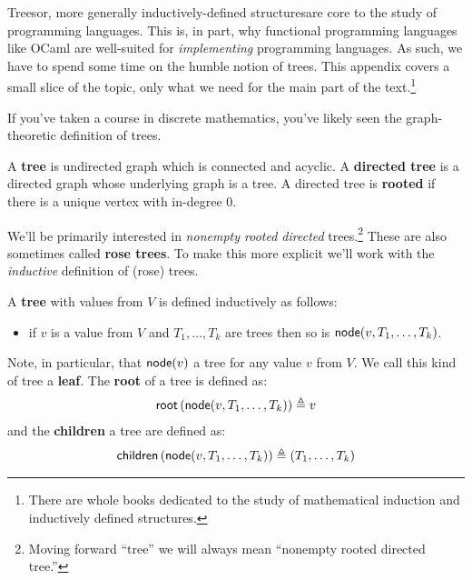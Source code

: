 Trees\textemdash or, more generally inductively-defined structures\textemdash are core to the study of programming languages.
This is, in part, why functional programming languages like OCaml are well-suited for \textit{implementing} programming languages.
As such, we have to spend some time on the humble notion of trees.
This appendix covers a small slice of the topic, only what we need for the main part of the text.\footnote{
There are whole books dedicated to the study of mathematical induction and inductively defined structures.
}

If you've taken a course in discrete mathematics, you've likely seen the graph-theoretic definition of trees.

\begin{definition}
  A \textbf{tree} is undirected graph which is connected and acyclic.
  A \textbf{directed tree} is a directed graph whose underlying graph is a tree.
  A directed tree is \textbf{rooted} if there is a unique vertex with in-degree 0.
\end{definition}
%
We'll be primarily interested in \textit{nonempty rooted directed} trees.\footnote{
Moving forward \enquote{tree} we will always mean \enquote{nonempty rooted directed tree.}
}
These are also sometimes called \textbf{rose trees}.
To make this more explicit we'll work with the \textit{inductive} definition of (rose) trees.

\begin{definition}
  \label{def:rose-tree}
  A \textbf{tree} with values from $V$ is defined inductively as follows:
  \begin{itemize}
  \item if $v$ is a value from $V$ and $T_1, \dots, T_k$ are trees then so is $\mathsf{node}(v, T_1, \dots, T_k)$.
  \end{itemize}
  Note, in particular, that $\mathsf{node}(v)$ a tree for any value $v$ from $V$.
  We call this kind of tree a \textbf{leaf}.
  The \textbf{root} of a tree is defined as:
  \begin{align*}
    \mathsf{root}\left(\mathsf{node}(v, T_1, \dots, T_k)\right) \triangleq v
  \end{align*}
  and the \textbf{children} a tree are defined as:
  \begin{align*}
    \mathsf{children}\left(\mathsf{node}(v, T_1, \dots, T_k)\right) \triangleq (T_1, \dots, T_k)
  \end{align*}
\end{definition}

